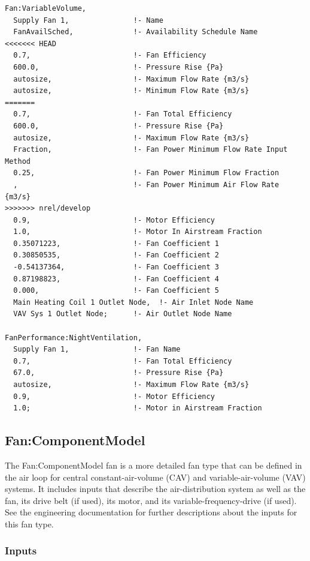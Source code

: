 \begin{lstlisting}
Fan:VariableVolume,
  Supply Fan 1,               !- Name
  FanAvailSched,              !- Availability Schedule Name
<<<<<<< HEAD
  0.7,                        !- Fan Efficiency
  600.0,                      !- Pressure Rise {Pa}
  autosize,                   !- Maximum Flow Rate {m3/s}
  autosize,                   !- Minimum Flow Rate {m3/s}
=======
  0.7,                        !- Fan Total Efficiency
  600.0,                      !- Pressure Rise {Pa}
  autosize,                   !- Maximum Flow Rate {m3/s}
  Fraction,                   !- Fan Power Minimum Flow Rate Input Method
  0.25,                       !- Fan Power Minimum Flow Fraction
  ,                           !- Fan Power Minimum Air Flow Rate {m3/s}
>>>>>>> nrel/develop
  0.9,                        !- Motor Efficiency
  1.0,                        !- Motor In Airstream Fraction
  0.35071223,                 !- Fan Coefficient 1
  0.30850535,                 !- Fan Coefficient 2
  -0.54137364,                !- Fan Coefficient 3
  0.87198823,                 !- Fan Coefficient 4
  0.000,                      !- Fan Coefficient 5
  Main Heating Coil 1 Outlet Node,  !- Air Inlet Node Name
  VAV Sys 1 Outlet Node;      !- Air Outlet Node Name

FanPerformance:NightVentilation,
  Supply Fan 1,               !- Fan Name
  0.7,                        !- Fan Total Efficiency
  67.0,                       !- Pressure Rise {Pa}
  autosize,                   !- Maximum Flow Rate {m3/s}
  0.9,                        !- Motor Efficiency
  1.0;                        !- Motor in Airstream Fraction
\end{lstlisting}

\subsection{Fan:ComponentModel}\label{fancomponentmodel}

The Fan:ComponentModel fan is a more detailed fan type that can be defined in the air loop for central constant-air-volume (CAV) and variable-air-volume (VAV) systems. It includes inputs that describe the air-distribution system as well as the fan, its drive belt (if used), its motor, and its variable-frequency-drive (if used). See the engineering documentation for further descriptions about the inputs for this fan type.

\subsubsection{Inputs}\label{inputs-5-011}

